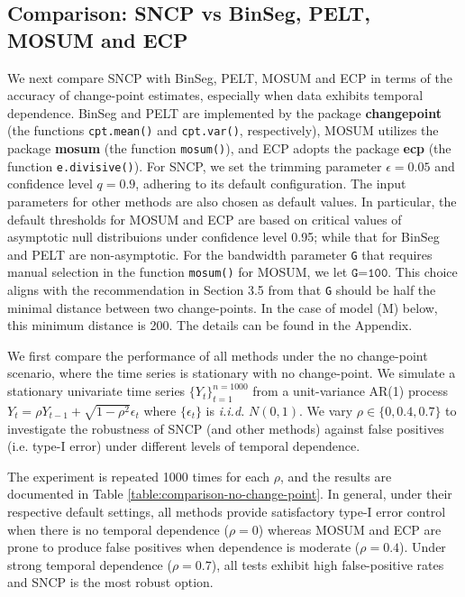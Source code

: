 \subsection{{Comparison: SNCP vs BinSeg, PELT, MOSUM and ECP}}\label{subsec:comparison-of-methods}
{We next compare SNCP with BinSeg, PELT, MOSUM and ECP in terms of the accuracy of change-point estimates, especially when data exhibits temporal dependence. BinSeg and PELT are implemented by  the package \textbf{changepoint} (the functions \texttt{cpt.mean()} and \texttt{cpt.var()}, respectively), MOSUM  utilizes the package \textbf{mosum} (the function \texttt{mosum()}), and ECP adopts the package \textbf{ecp} (the function \texttt{e.divisive()}). For SNCP, we set the trimming parameter $\epsilon=0.05$ and confidence level $q=0.9$, adhering to its default configuration. The input parameters for other methods are also chosen as default values.  In particular, the default thresholds for MOSUM and ECP are based on  critical values of asymptotic null distribuions under confidence level 0.95; while that for BinSeg and PELT are  non-asymptotic.  For the bandwidth parameter \texttt{G} that requires manual selection in the function \texttt{mosum()} for MOSUM,   we  let $\texttt{G=100}$. This choice aligns with the recommendation in Section 3.5 from \cite{eichinger2018mosum} that \texttt{G} should be half the minimal distance between two change-points. In the case of model (M) below, this minimum distance is 200. The details can be found in the Appendix.}



{We first compare the performance of all methods under the no change-point scenario, where the time series is stationary with no change-point. We simulate a stationary univariate time series $\{Y_t\}_{t=1}^{n=1000}$ from a unit-variance AR(1) process $Y_t=\rho Y_{t-1}+\sqrt{1-\rho^2}\epsilon_t$ where $\{\epsilon_t\}$ is \textit{i.i.d.}  $N(0,1)$. We vary $\rho\in\{0,0.4,0.7\}$ to investigate the robustness of SNCP (and other methods) against false positives (i.e. type-I error) under different levels of temporal dependence. }

{The experiment is repeated 1000 times for each $\rho$, and the results are documented in Table \ref{table:comparison-no-change-point}.   
In general, under their respective default settings, all methods provide satisfactory type-I error control when there is no temporal dependence ($\rho=0$)  whereas MOSUM and ECP are prone to produce false positives when dependence is moderate ($\rho=0.4$). Under strong temporal dependence ($\rho=0.7$), all tests exhibit high false-positive rates and SNCP is the most robust option. }

